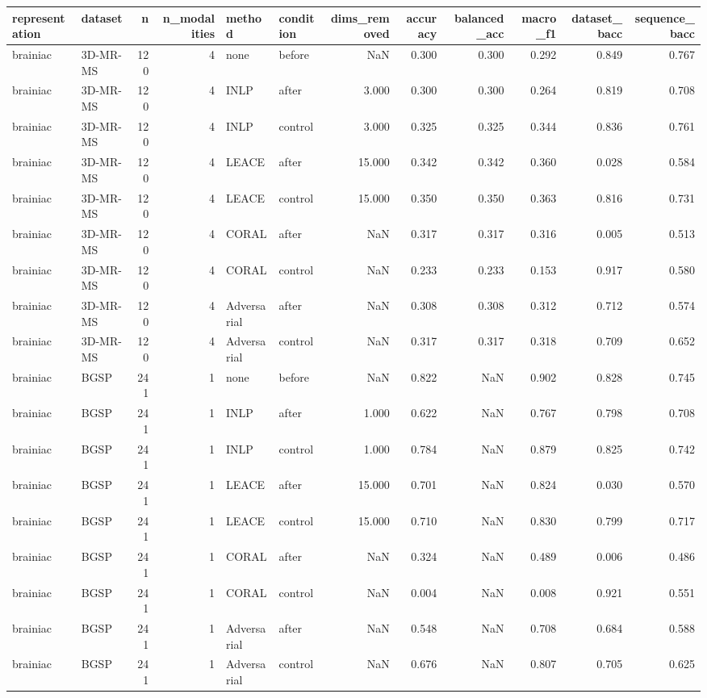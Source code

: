 \begin{tabular}{llrrllrrrrrr}
\toprule
representation & dataset & n & n\_modalities & method & condition & dims\_removed & accuracy & balanced\_acc & macro\_f1 & dataset\_bacc & sequence\_bacc \\
\midrule
brainiac & 3D-MR-MS & 120 & 4 & none & before & NaN & 0.300 & 0.300 & 0.292 & 0.849 & 0.767 \\
brainiac & 3D-MR-MS & 120 & 4 & INLP & after & 3.000 & 0.300 & 0.300 & 0.264 & 0.819 & 0.708 \\
brainiac & 3D-MR-MS & 120 & 4 & INLP & control & 3.000 & 0.325 & 0.325 & 0.344 & 0.836 & 0.761 \\
brainiac & 3D-MR-MS & 120 & 4 & LEACE & after & 15.000 & 0.342 & 0.342 & 0.360 & 0.028 & 0.584 \\
brainiac & 3D-MR-MS & 120 & 4 & LEACE & control & 15.000 & 0.350 & 0.350 & 0.363 & 0.816 & 0.731 \\
brainiac & 3D-MR-MS & 120 & 4 & CORAL & after & NaN & 0.317 & 0.317 & 0.316 & 0.005 & 0.513 \\
brainiac & 3D-MR-MS & 120 & 4 & CORAL & control & NaN & 0.233 & 0.233 & 0.153 & 0.917 & 0.580 \\
brainiac & 3D-MR-MS & 120 & 4 & Adversarial & after & NaN & 0.308 & 0.308 & 0.312 & 0.712 & 0.574 \\
brainiac & 3D-MR-MS & 120 & 4 & Adversarial & control & NaN & 0.317 & 0.317 & 0.318 & 0.709 & 0.652 \\
brainiac & BGSP & 241 & 1 & none & before & NaN & 0.822 & NaN & 0.902 & 0.828 & 0.745 \\
brainiac & BGSP & 241 & 1 & INLP & after & 1.000 & 0.622 & NaN & 0.767 & 0.798 & 0.708 \\
brainiac & BGSP & 241 & 1 & INLP & control & 1.000 & 0.784 & NaN & 0.879 & 0.825 & 0.742 \\
brainiac & BGSP & 241 & 1 & LEACE & after & 15.000 & 0.701 & NaN & 0.824 & 0.030 & 0.570 \\
brainiac & BGSP & 241 & 1 & LEACE & control & 15.000 & 0.710 & NaN & 0.830 & 0.799 & 0.717 \\
brainiac & BGSP & 241 & 1 & CORAL & after & NaN & 0.324 & NaN & 0.489 & 0.006 & 0.486 \\
brainiac & BGSP & 241 & 1 & CORAL & control & NaN & 0.004 & NaN & 0.008 & 0.921 & 0.551 \\
brainiac & BGSP & 241 & 1 & Adversarial & after & NaN & 0.548 & NaN & 0.708 & 0.684 & 0.588 \\
brainiac & BGSP & 241 & 1 & Adversarial & control & NaN & 0.676 & NaN & 0.807 & 0.705 & 0.625 \\

\end{tabular}
